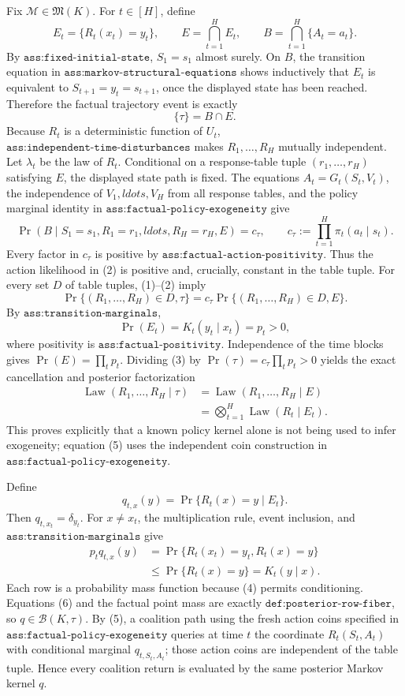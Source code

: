 Fix \(\mathcal M\in\mathfrak M(K)\).  For \(t\in[H]\), define
\[
 E_t=\{R_t(x_t)=y_t\},\qquad E=\bigcap_{t=1}^H E_t,
 \qquad B=\bigcap_{t=1}^H\{A_t=a_t\}.
\]
By \(\texttt{ass:fixed-initial-state}\), \(S_1=s_1\) almost surely.  On \(B\), the transition equation in \(\texttt{ass:markov-structural-equations}\) shows inductively that \(E_t\) is equivalent to \(S_{t+1}=y_t=s_{t+1}\), once the displayed state has been reached.  Therefore the factual trajectory event is exactly
\[
 \{\tau\}=B\cap E. \tag{1}
\]
Because \(R_t\) is a deterministic function of \(U_t\), \(\texttt{ass:independent-time-disturbances}\) makes \(R_1,\ldots,R_H\) mutually independent.  Let \(\lambda_t\) be the law of \(R_t\).  Conditional on a response-table tuple \((r_1,\ldots,r_H)\) satisfying \(E\), the displayed state path is fixed.  The equations \(A_t=G_t(S_t,V_t)\), the independence of \(V_1,ldots,V_H\) from all response tables, and the policy marginal identity in \(\texttt{ass:factual-policy-exogeneity}\) give
\[
 \Pr(B\mid S_1=s_1,R_1=r_1,ldots,R_H=r_H,E)
 =c_\tau,
 \qquad
 c_\tau:=\prod_{t=1}^H\pi_t(a_t\mid s_t). \tag{2}
\]
Every factor in \(c_\tau\) is positive by \(\texttt{ass:factual-action-positivity}\).  Thus the action likelihood in (2) is positive and, crucially, constant in the table tuple.  For every set \(D\) of table tuples, (1)--(2) imply
\[
 \Pr\{(R_1,\ldots,R_H)\in D,\tau\}
 =c_\tau\Pr\{(R_1,\ldots,R_H)\in D,E\}. \tag{3}
\]
By \(\texttt{ass:transition-marginals}\),
\[
 \Pr(E_t)=K_t(y_t\mid x_t)=p_t>0, \tag{4}
\]
where positivity is \(\texttt{ass:factual-positivity}\).  Independence of the time blocks gives \(\Pr(E)=\prod_t p_t\).  Dividing (3) by \(\Pr(\tau)=c_\tau\prod_t p_t>0\) yields the exact cancellation and posterior factorization
\[
 \begin{aligned}
 \operatorname{Law}(R_1,\ldots,R_H\mid\tau)
 &=\operatorname{Law}(R_1,\ldots,R_H\mid E)\\
 &=\bigotimes_{t=1}^H\operatorname{Law}(R_t\mid E_t).
 \end{aligned} \tag{5}
\]
This proves explicitly that a known policy kernel alone is not being used to infer exogeneity; equation (5) uses the independent coin construction in \(\texttt{ass:factual-policy-exogeneity}\).

Define
\[
 q_{t,x}(y)=\Pr\{R_t(x)=y\mid E_t\}.
\]
Then \(q_{t,x_t}=\delta_{y_t}\).  For \(x\ne x_t\), the multiplication rule, event inclusion, and \(\texttt{ass:transition-marginals}\) give
\[
 \begin{aligned}
 p_tq_{t,x}(y)
 &=\Pr\{R_t(x_t)=y_t,R_t(x)=y\}\\
 &\le \Pr\{R_t(x)=y\}=K_t(y\mid x).
 \end{aligned} \tag{6}
\]
Each row is a probability mass function because (4) permits conditioning.  Equations (6) and the factual point mass are exactly \(\texttt{def:posterior-row-fiber}\), so \(q\in\mathcal B(K,\tau)\).  By (5), a coalition path using the fresh action coins specified in \(\texttt{ass:factual-policy-exogeneity}\) queries at time \(t\) the coordinate \(R_t(S_t,A_t)\) with conditional marginal \(q_{t,S_t,A_t}\); those action coins are independent of the table tuple.  Hence every coalition return is evaluated by the same posterior Markov kernel \(q\).

